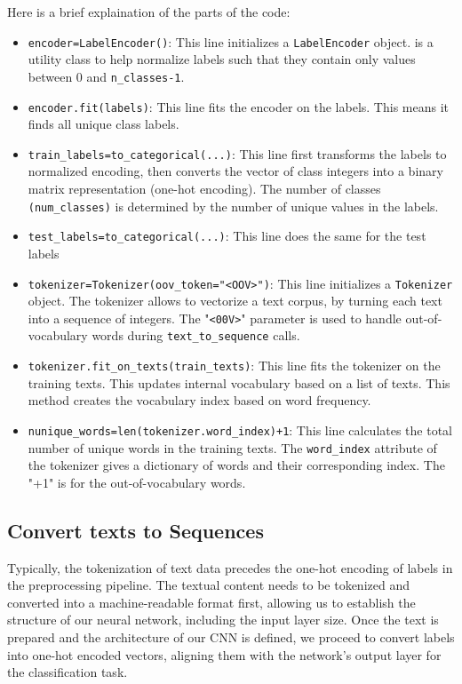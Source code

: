 Here is a brief explaination of the parts of the code:
\begin{itemize}
	\item \verb*|encoder=LabelEncoder()|: This line initializes a \verb*|LabelEncoder| object. is a utility class to help normalize labels such that they contain only values between $0$ and \verb*|n_classes-1|.
	
	\item \verb*|encoder.fit(labels)|: This line fits the encoder on the labels. This means it finds all unique class labels.
	
	\item \verb*|train_labels=to_categorical(...)|: This line first transforms the labels to normalized encoding, then converts the vector of class integers into a binary matrix representation (one-hot encoding). The number of classes \verb*|(num_classes)| is determined by the number of unique values in the labels.
	
	\item \verb*|test_labels=to_categorical(...)|:  This line does the same for the test labels
	
	\item \verb*|tokenizer=Tokenizer(oov_token="<OOV>")|: This line initializes a \verb*|Tokenizer| object. The tokenizer allows to vectorize a text corpus, by turning each text into a sequence of integers. The "\verb*|<00V>|" parameter is used to handle out-of-vocabulary words during \verb*|text_to_sequence| calls.
	
	\item \verb*|tokenizer.fit_on_texts(train_texts)|: This line fits the tokenizer on the training texts. This updates internal vocabulary based on a list of texts. This method creates the vocabulary index based on word frequency.
	
	\item \verb*|nunique_words=len(tokenizer.word_index)+1|: This line calculates the total number of unique words in the training texts. The \verb*|word_index| attribute of the tokenizer gives a dictionary of words and their corresponding index. The "+1" is for the out-of-vocabulary words.
\end{itemize}

\subsection{Convert texts to Sequences}
Typically, the tokenization of text data precedes the one-hot encoding of labels in the preprocessing pipeline. The textual content needs to be tokenized and converted into a machine-readable format first, allowing us to establish the structure of our neural network, including the input layer size. Once the text is prepared and the architecture of our CNN is defined, we proceed to convert labels into one-hot encoded vectors, aligning them with the network's output layer for the classification task.

